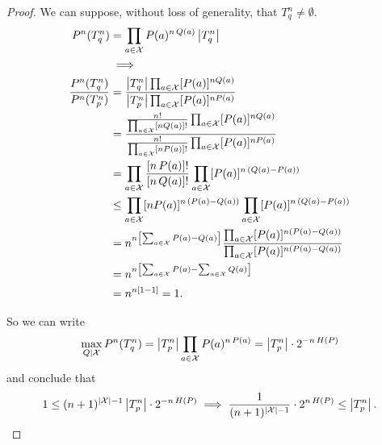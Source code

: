 \begin{proof}
	We can suppose, without loss of generality, that $T^n_q \neq \emptyset$.
	\begin{align*}
		P^n(T_q^n)
		& =
		\prod_{a \in \mathcal{X}} P(a)^{n \, Q(a)} \left|{T_q^n}\right|
		\\
		& \implies
		\\
		\frac{
			P^n(T_q^n)
		}{
			P^n(T_p^n)
		}
		& =
		\frac{
			\left|{T_q^n}\right| \prod_{a \in \mathcal{X}} [P(a)]^{n Q(a)}
		}{
			\left|{T_p^n}\right| \prod_{a \in \mathcal{X}} [P(a)]^{n P(a)}
		}
		\\
		& =
		\frac{
			\frac{n!}{\prod_{a\in\mathcal{X}} [nQ(a)]!} \prod_{a \in \mathcal{X}} [P(a)]^{n Q(a)}
		}{
			\frac{n!}{\prod_{a\in\mathcal{X}} [nP(a)]!} \prod_{a \in \mathcal{X}} [P(a)]^{n P(a)}
		}
		\\
		& =
		\prod_{a \in \mathcal{X}}
		\frac{[n \, P(a)]!}{[n \, Q(a)]!}
		\prod_{a \in \mathcal{X}}
		[P(a)]^{n \, (Q(a)-P(a))}
		\\
		& \le
		\prod_{a \in \mathcal{X}}
		[nP(a)]^{n \, (P(a)-Q(a))}
		\prod_{a \in \mathcal{X}}
		[P(a)]^{n \, (Q(a)-P(a))}
		\\
		& =
		n^{n \left[ \sum_{a \in \mathcal{X}} P(a) - Q(a) \right]}
		\frac{
			\prod_{a \in \mathcal{X}} [P(a)]^{n (P(a)-Q(a))}
		}{
			\prod_{a \in \mathcal{X}} [P(a)]^{n (P(a)-Q(a))}
		}
		\\
		& =
		n^{n \left[ \sum_{a \in \mathcal{X}} P(a) - \sum_{a \in \mathcal{X}} Q(a) \right]}
		\\
		& =
		n^{n[1-1]}
		=
		1.
	\end{align*}

	So we can write
	\begin{equation*}
		\max_{Q|\mathcal{X}} P^n(T_q^n)
		=
		\left|{T_p^n}\right| \prod_{a \in \mathcal{X}} P(a)^{n \, P(a)}
		=
		\left|{T_p^n}\right| \cdot 2^{-n \, H(P)}
	\end{equation*}
	and conclude that
	\begin{equation*}
		1
		\le
		(n+1)^{\left|{\mathcal{X}}\right|-1} \left|{T_p^n}\right| \cdot 2^{-n \, H(P)}
		\implies
		\frac{1}{(n+1)^{\left|{\mathcal{X}}\right|-1}} \cdot 2^{n \, H(P)} \le \left|{T_p^n}\right|.
	\end{equation*}
\end{proof}

